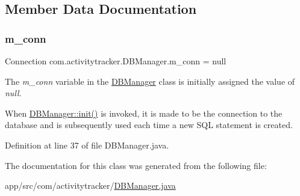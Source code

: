 \subsection{Member Data Documentation}
\mbox{\label{classcom_1_1activitytracker_1_1_d_b_manager_a064088d13ac09eb147fdc19268771521}} 
\subsubsection{\texorpdfstring{m\_conn}{m\_conn}}
{\footnotesize\ttfamily Connection com.\+activitytracker.\+D\+B\+Manager.\+m\+\_\+conn = null\hspace{0.3cm}{\ttfamily [private]}}

The {\itshape m\+\_\+conn} variable in the \mbox{\hyperlink{classcom_1_1activitytracker_1_1_d_b_manager}{D\+B\+Manager}} class is initially assigned the value of {\itshape null}.

When \mbox{\hyperlink{classcom_1_1activitytracker_1_1_d_b_manager_a41df4600bb5901a26a4ea6a7108a70b9}{D\+B\+Manager\+::init()}} is invoked, it is made to be the connection to the database and is subsequently used each time a new S\+QL statement is created. 

Definition at line 37 of file D\+B\+Manager.\+java.



The documentation for this class was generated from the following file\+:\begin{DoxyCompactItemize}
\item 
app/src/com/activitytracker/\mbox{\hyperlink{_d_b_manager_8java}{D\+B\+Manager.\+java}}\end{DoxyCompactItemize}
